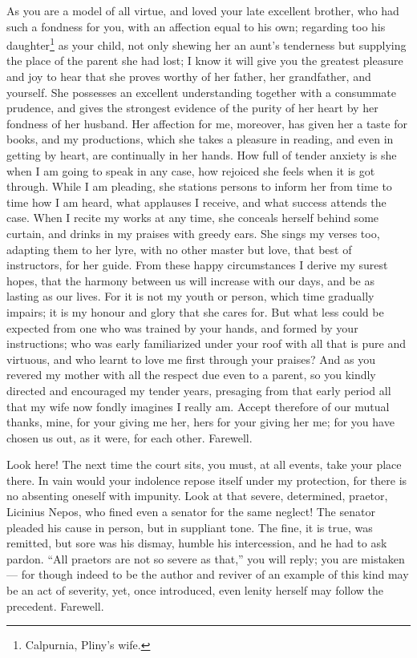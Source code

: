 As you are a model of all virtue, and loved your late excellent brother,
who had such a fondness for you, with an affection equal to his own;
regarding too his daughter\footnote{Calpurnia, Pliny's wife.} as your child, not only shewing her an aunt's
tenderness but supplying the place of the parent she had lost; I know it
will give you the greatest pleasure and joy to hear that she proves worthy
of her father, her grandfather, and yourself. She possesses an excellent
understanding together with a consummate prudence, and gives the strongest
evidence of the purity of her heart by her fondness of her husband. Her
affection for me, moreover, has given her a taste for books, and my
productions, which she takes a pleasure in reading, and even in getting by
heart, are continually in her hands. How full of tender anxiety is she
when I am going to speak in any case, how rejoiced she feels when it is
got through. While I am pleading, she stations persons to inform her from
time to time how I am heard, what applauses I receive, and what success
attends the case. When I recite my works at any time, she conceals herself
behind some curtain, and drinks in my praises with greedy ears. She sings
my verses too, adapting them to her lyre, with no other master but love,
that best of instructors, for her guide. From these happy circumstances I
derive my surest hopes, that the harmony between us will increase with our
days, and be as lasting as our lives. For it is not my youth or person,
which time gradually impairs; it is my honour and glory that she cares
for. But what less could be expected from one who was trained by your
hands, and formed by your instructions; who was early familiarized under
your roof with all that is pure and virtuous, and who learnt to love me
first through your praises? And as you revered my mother with all the
respect due even to a parent, so you kindly directed and encouraged my
tender years, presaging from that early period all that my wife now fondly
imagines I really am. Accept therefore of our mutual thanks, mine, for
your giving me her, hers for your giving her me; for you have chosen us
out, as it were, for each other. Farewell.


Look here! The next time the court sits, you must, at all events, take
your place there. In vain would your indolence repose itself under my
protection, for there is no absenting oneself with impunity. Look at that
severe, determined, praetor, Licinius Nepos, who fined even a senator for
the same neglect! The senator pleaded his cause in person, but in
suppliant tone. The fine, it is true, was remitted, but sore was his
dismay, humble his intercession, and he had to ask pardon. ``All praetors
are not so severe as that,'' you will reply; you are mistaken — for
though indeed to be the author and reviver of an example of this kind may
be an act of severity, yet, once introduced, even lenity herself may
follow the precedent. Farewell.

